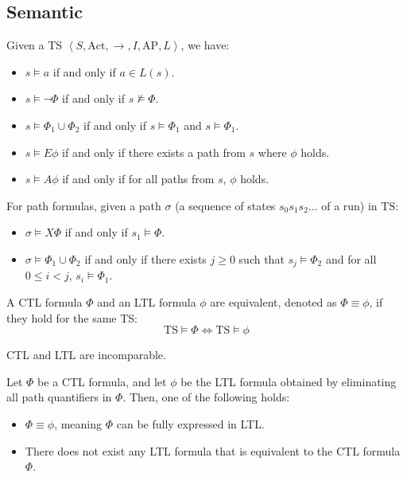 \subsection{Semantic}
Given a TS $\left\langle S, \text{Act}, \rightarrow, I,\text{AP}, L\right\rangle$, we have: 
\begin{itemize}
    \item $s \models a$ if and only if $a \in L(s)$. 
    \item $s \models \lnot \Phi$ if and only if $s \not\models \Phi$.
    \item $s \models \Phi_1 \cup \Phi_2$ if and only if $s \models \Phi_1$ and $s \models \Phi_1$.
    \item $s \models E\phi$ if and only if there exists a path from $s$ where $\phi$ holds. 
    \item $s \models A\phi$  if and only if for all paths from $s$, $\phi$ holds. 
\end{itemize}
\noindent For path formulas, given a path $\sigma$ (a sequence of states $s_0s_1s_2\dots$ of a run) in $\text{TS}$: 
\begin{itemize}
    \item $\sigma \models X\Phi$ if and only if $s_1 \models \Phi$.
    \item $\sigma \models \Phi_1 \cup \Phi_2$ if and only if there exists $j\geq 0$ such that $s_j \models \Phi_2$ and for all $0 \leq i < j$, $s_i \models \Phi_1$.
\end{itemize}
\noindent A CTL formula $\Phi$ and an LTL formula $\phi$ are equivalent, denoted as $\Phi\equiv\phi$, if they hold for the same TS: 
\[\text{TS} \models \Phi \Leftrightarrow \text{TS} \models \phi\]
\begin{theorem}
    CTL and LTL are incomparable.
\end{theorem}
\begin{theorem}
    Let $\Phi$ be a CTL formula, and let $\phi$ be the LTL formula obtained by eliminating all path quantifiers in $\Phi$. 
    Then, one of the following holds:
    \begin{itemize}
        \item $\Phi\equiv\phi$, meaning $\Phi$ can be fully expressed in LTL.
        \item There does not exist any LTL formula that is equivalent to the CTL formula $\Phi$.
    \end{itemize}
\end{theorem}

